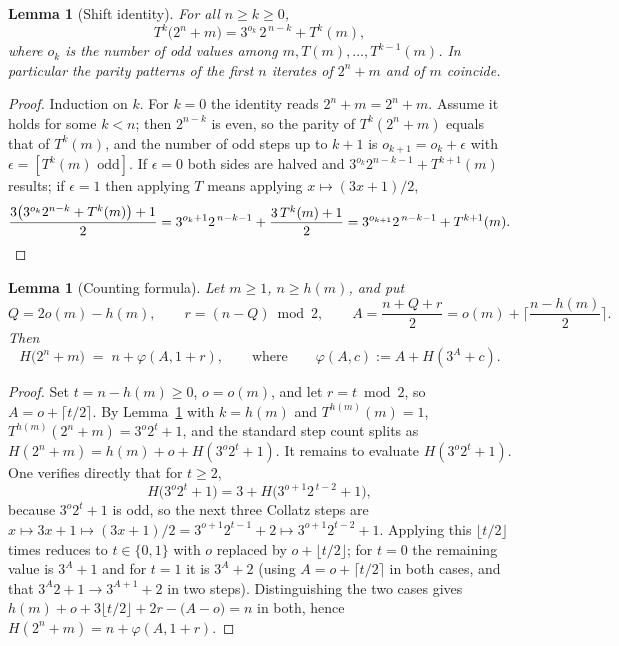\documentclass[11pt]{article}
\newtheorem{lemma}[theorem]{Lemma}
\theoremstyle{remark}
\newcommand{\TT}{T}
\newcommand{\ooo}{o}
\newcommand{\hh}{h}
\begin{document}
\begin{lemma}[Shift identity]\label{lem:shift}
For all $n\ge k\ge0$,
\[
\TT^{k}\!\big(2^{n}+m\big)=3^{\ooo_k}\,2^{\,n-k}+\TT^{k}(m),
\]
where $\ooo_k$ is the number of odd values among $m,\TT(m),\dots,\TT^{k-1}(m)$.
In particular the parity patterns of the first $n$ iterates of $2^n+m$ and of $m$ coincide.
\end{lemma}

\begin{proof}
Induction on $k$. For $k=0$ the identity reads $2^n+m=2^n+m$. Assume it holds for some $k<n$; then
$2^{n-k}$ is even, so the parity of $\TT^k(2^n+m)$ equals that of $\TT^k(m)$, and the number of odd
steps up to $k+1$ is $\ooo_{k+1}=\ooo_k+\epsilon$ with $\epsilon=[\TT^k(m)\text{ odd}]$. If $\epsilon=0$
both sides are halved and $3^{\ooo_k}2^{n-k-1}+\TT^{k+1}(m)$ results; if $\epsilon=1$ then applying
$\TT$ means applying $x\mapsto(3x+1)/2$,
\[
\frac{3\big(3^{\ooo_k}2^{n-k}+\TT^k(m)\big)+1}{2}
=3^{\ooo_k+1}2^{\,n-k-1}+\frac{3\,\TT^k(m)+1}{2}
=3^{\ooo_{k+1}}2^{\,n-k-1}+\TT^{k+1}(m).\qedhere
\]
\end{proof}

\begin{lemma}[Counting formula]\label{lem:formula}
Let $m\ge1$, $n\ge\hh(m)$, and put
\[
Q=2\ooo(m)-\hh(m),\qquad r=(n-Q)\bmod 2,\qquad A=\frac{n+Q+r}{2}=\ooo(m)+\Big\lceil\frac{n-\hh(m)}2\Big\rceil .
\]
Then
\[
H\!\big(2^{n}+m\big)\;=\;n+\varphi(A,1+r),
\qquad\text{where}\qquad \varphi(A,c):=A+H(3^{A}+c).
\]
\end{lemma}

\begin{proof}
Set $t=n-\hh(m)\ge0$, $\ooo=\ooo(m)$, and let $r=t\bmod2$, so $A=\ooo+\lceil t/2\rceil$.
By Lemma~\ref{lem:shift} with $k=\hh(m)$ and $\TT^{\hh(m)}(m)=1$,
$\TT^{\hh(m)}(2^n+m)=3^{\ooo}2^{t}+1$,
and the standard step count splits as
$H(2^n+m)=\hh(m)+\ooo+H(3^{\ooo}2^{t}+1)$.
It remains to evaluate $H(3^{\ooo}2^{t}+1)$. One verifies directly that for $t\ge2$,
\[
H\!\big(3^{\ooo}2^{t}+1\big)=3+H\!\big(3^{\ooo+1}2^{\,t-2}+1\big),
\]
because $3^{\ooo}2^t+1$ is odd, so the next three Collatz steps are
$x\mapsto3x+1\mapsto(3x+1)/2=3^{\ooo+1}2^{t-1}+2\mapsto3^{\ooo+1}2^{t-2}+1$.
Applying this $\lfloor t/2\rfloor$ times reduces to $t\in\{0,1\}$ with $\ooo$ replaced by
$\ooo+\lfloor t/2\rfloor$; for $t=0$ the remaining value is $3^{A}+1$ and for $t=1$ it is
$3^{A}+2$ (using $A=\ooo+\lceil t/2\rceil$ in both cases, and that $3^{A}2+1\to3^{A+1}+2$ in two steps).
Distinguishing the two cases gives $\hh(m)+\ooo+3\lfloor t/2\rfloor+2r-\big(A-\ooo\big)=n$ in both,
hence $H(2^n+m)=n+\varphi(A,1+r)$.
\end{proof}
\end{document}
